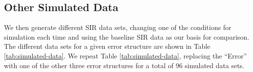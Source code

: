 \documentclass[12pt]{article}
\begin{document}
      \subsection{Other Simulated Data}

We then generate different SIR data sets, changing one of the conditions for simulation each time and using the baseline SIR data as our basis for comparison. The different data sets for a given error structure are shown in Table \ref{tab:simulated-data}.  We repeat  Table \ref{tab:simulated-data}, replacing the ``Error'' with  one of the other three error structures for a total of 96 simulated data sets.


\end{document}
